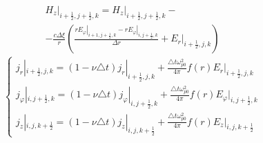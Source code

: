 \documentclass[a4paper]{article}
\begin{document}
	\begin{multline*}
		\left.H_{z}\right|_{i+\frac{1}{2},j+\frac{1}{2},k}=\left.H_{z}\right|_{i+\frac{1}{2},j+\frac{1}{2},k}-\\
		-\frac{c\Delta\xi}{r}\left(\frac{\left.rE_{\varphi}\right|_{i+1,j+\frac{1}{2},k}-\left.rE_{\varphi}\right|_{i,j+\frac{1}{2},k}}{\Delta r}+\left.E_{r}\right|_{i+\frac{1}{2},j,k}\right)
	\end{multline*}
	\begin{equation*}
		\begin{cases*}
			j_{r}|_{i+\frac{1}{2},j,k}=(1-\nu\triangle t) j_{r}|_{i+\frac{1}{2},j,k}+\frac{\triangle t\omega_{p0}^{2}}{4\pi} f(r)E_r|_{i+\frac{1}{2},j,k}\\
			j_{\varphi}|_{i,j+\frac{1}{2},k}=(1-\nu\triangle t) j_{\varphi}|_{i,j+\frac{1}{2},k}+\frac{\triangle t\omega_{p0}^{2}}{4\pi}f(r)E_{\varphi}|_{i,j+\frac{1}{2},k}\\
			j_{z}|_{i,j,k+\frac{1}{2}}=(1-\nu\triangle t) j_{z}|_{i,j,k+\frac{1}{2}}+\frac{\triangle t\omega_{p0}^{2}}{4\pi}f(r)E_{z}|_{i,j,k+\frac{1}{2}}
		\end{cases*}
	\end{equation*}\newpage  
\end{document}
